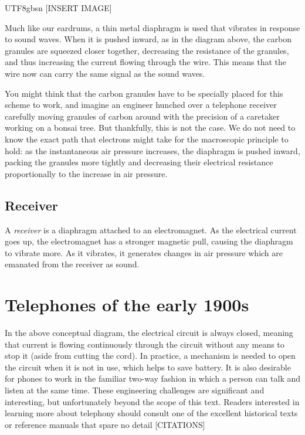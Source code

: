 \documentclass[UTF8]{book}
\begin{document}
\begin{CJK}{UTF8}{gbsn}
[INSERT IMAGE]

Much like our eardrums, a thin metal diaphragm is used that vibrates in response to sound waves. When it is pushed inward, as in the diagram above, the carbon granules are squeezed closer together, decreasing the resistance of the granules, and thus increasing the current flowing through the wire. This means that the wire now can carry the same signal as the sound waves.

You might think that the carbon granules have to be specially placed for this scheme to work, and imagine an engineer hunched over a telephone receiver carefully moving granules of carbon around with the precision of a caretaker working on a bonsai tree. But thankfully, this is not the case. We do not need to know the exact path that electrons might take for the macroscopic principle to hold: as the instantaneous air pressure increases, the diaphragm is pushed inward, packing the granules more tightly and decreasing their electrical resistance proportionally to the increase in air pressure.

\subsection{Receiver}

A \emph{receiver} is a diaphragm attached to an electromagnet. As the electrical current goes up, the electromagnet has a stronger magnetic pull, causing the diaphragm to vibrate more. As it vibrates, it generates changes in air pressure which are emanated from the receiver as sound.

\section{Telephones of the early 1900s}

In the above conceptual diagram, the electrical circuit is always closed, meaning that current is flowing continuously through the circuit without any means to stop it (aside from cutting the cord). In practice, a mechanism is needed to open the circuit when it is not in use, which helps to save battery. It is also desirable for phones to work in the familiar two-way fashion in which a person can talk and listen at the same time. These engineering challenges are significant and interesting, but unfortunately beyond the scope of this text. Readers interested in learning more about telephony should consult one of the excellent historical texts or reference manuals that spare no detail [CITATIONS]


\end{CJK}
\end{document}
